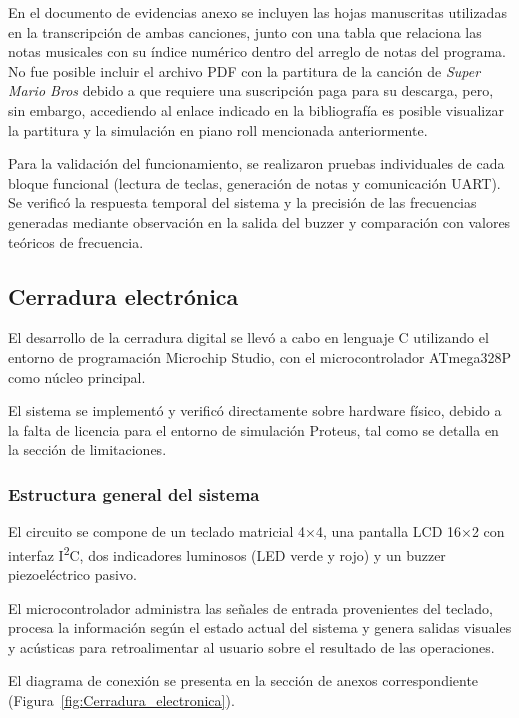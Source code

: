 En el documento de evidencias anexo se incluyen las hojas manuscritas utilizadas en la transcripción de ambas canciones, junto con una tabla que relaciona las notas musicales con su índice numérico dentro del arreglo de notas del programa. No fue posible incluir el archivo PDF con la partitura de la canción de \textit{Super Mario Bros} debido a que requiere una suscripción paga para su descarga, pero, sin embargo, accediendo al enlace indicado en la bibliografía es posible visualizar la partitura y la simulación en piano roll mencionada anteriormente.

Para la validación del funcionamiento, se realizaron pruebas individuales de cada bloque funcional (lectura de teclas, generación de notas y comunicación UART). Se verificó la respuesta temporal del sistema y la precisión de las frecuencias generadas mediante observación en la salida del buzzer y comparación con valores teóricos de frecuencia.

\vspace{0.4cm}

\subsection{Cerradura electrónica}

El desarrollo de la cerradura digital se llevó a cabo en lenguaje C utilizando el entorno de programación Microchip Studio, con el microcontrolador ATmega328P como núcleo principal. 

El sistema se implementó y verificó directamente sobre hardware físico, debido a la falta de licencia para el entorno de simulación Proteus, tal como se detalla en la sección de limitaciones. 

\subsubsection{Estructura general del sistema}

El circuito se compone de un teclado matricial 4×4, una pantalla LCD 16×2 con interfaz I\textsuperscript{2}C, dos indicadores luminosos (LED verde y rojo) y un buzzer piezoeléctrico pasivo. 

El microcontrolador administra las señales de entrada provenientes del teclado, procesa la información según el estado actual del sistema y genera salidas visuales y acústicas para retroalimentar al usuario sobre el resultado de las operaciones.

El diagrama de conexión se presenta en la sección de anexos correspondiente (Figura~\ref{fig:Cerradura_electronica}).

